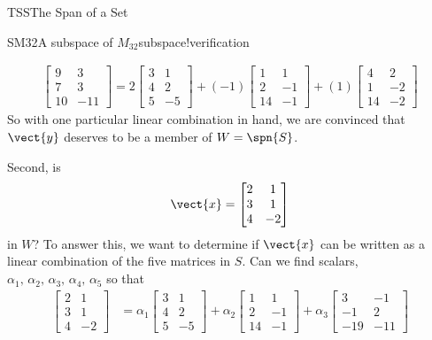 \begin{subsect}{TSS}{The Span of a Set}
\begin{example}{SM32}{A subspace of $M_{32}$}{subspace!verification}
\begin{para}
\begin{align*}
\begin{bmatrix}
9 & 3 \\ 7 & 3 \\ 10 & -11
\end{bmatrix}
=
2
\begin{bmatrix}
3 & 1 \\ 4 & 2 \\ 5 & -5
\end{bmatrix}
+(-1)
\begin{bmatrix}
1 & 1 \\ 2 & -1 \\ 14 & -1
\end{bmatrix}
+(1)
\begin{bmatrix}
4 & 2 \\ 1 & -2 \\ 14 & -2
\end{bmatrix}
%
\end{align*}
%
So with one particular linear combination in hand, we are convinced that $\vect{y}$ deserves to be a member of $W=\spn{S}$.\end{para}
%
\begin{para}Second, is
%
\begin{equation*}
\vect{x}=\begin{bmatrix}
2 & 1 \\ 3 & 1 \\ 4 & -2
\end{bmatrix}
\end{equation*}
%
in $W$?  To answer this, we want to determine if $\vect{x}$ can be written as a linear combination of the five matrices in $S$.  Can we find scalars, $\alpha_1,\,\alpha_2,\,\alpha_3,\,\alpha_4,\,\alpha_5$ so that
%
\begin{align*}
\begin{bmatrix}
2 & 1 \\ 3 & 1 \\ 4 & -2
\end{bmatrix}
&=
\alpha_1
\begin{bmatrix}
3 & 1 \\ 4 & 2 \\ 5 & -5
\end{bmatrix}
+\alpha_2
\begin{bmatrix}
1 & 1 \\ 2 & -1 \\ 14 & -1
\end{bmatrix}
+\alpha_3
\begin{bmatrix}
3 & -1 \\ -1 & 2 \\ -19 & -11

\end{bmatrix}
\end{align*}
\end{para}
\end{example}
\end{subsect}
